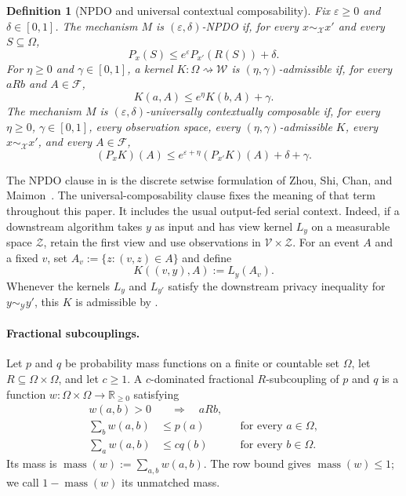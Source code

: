 \documentclass[11pt]{article}
\newtheorem{definition}[lemma]{Definition}
\begin{document}
\begin{definition}[NPDO and universal contextual composability]
\label{def:npdo-ucc}
Fix $\varepsilon\geq0$ and $\delta\in[0,1]$.
The mechanism $M$ is $(\varepsilon,\delta)$-NPDO if, for every
$x\sim_{\mathcal X}x'$ and every $S\subseteq\Omega$,
\begin{equation}
 P_x(S)\leq e^\varepsilon P_{x'}(R(S))+\delta.
 \label{eq:npdo}
\end{equation}
For $\eta\geq0$ and $\gamma\in[0,1]$, a kernel
$K:\Omega\rightsquigarrow\mathcal W$ is
$(\eta,\gamma)$-admissible if, for every $aRb$ and $A\in\mathcal F$,
\begin{equation}
 K(a,A)\leq e^\eta K(b,A)+\gamma.
 \label{eq:admissible}
\end{equation}
The mechanism $M$ is $(\varepsilon,\delta)$-universally contextually
composable if, for every $\eta\geq0$, $\gamma\in[0,1]$, every observation
space, every $(\eta,\gamma)$-admissible $K$, every
$x\sim_{\mathcal X}x'$, and every $A\in\mathcal F$,
\begin{equation}
 (P_xK)(A)
 \leq e^{\varepsilon+\eta}(P_{x'}K)(A)+\delta+\gamma.
 \label{eq:ucc}
\end{equation}
\end{definition}

The NPDO clause in  is the discrete setwise formulation of
Zhou, Shi, Chan, and Maimon~\cite{ZhouEtAl2023NPDO}.  The
universal-composability clause fixes the meaning of that term throughout this paper.
It includes the usual output-fed serial context.  Indeed, if a downstream
algorithm takes $y$ as input and has view kernel $L_y$ on a measurable space
$\mathcal Z$, retain the first view and use observations in
$\mathcal V\times\mathcal Z$.  For an event $A$ and a fixed $v$, set
$A_v:=\{z:(v,z)\in A\}$ and define
\[
 K((v,y),A):=L_y(A_v).
\]
Whenever the kernels $L_y$ and $L_{y'}$ satisfy the downstream privacy
inequality for $y\sim_{\mathcal Y}y'$, this $K$ is admissible by
.

\paragraph{Fractional subcouplings.}
Let $p$ and $q$ be probability mass functions on a finite or countable set
$\Omega$, let $R\subseteq\Omega\times\Omega$, and let $c\geq1$.  A
$c$-dominated fractional $R$-subcoupling of $p$ and $q$ is a function
$w:\Omega\times\Omega\to\mathbb R_{\geq0}$ satisfying
\begin{align}
 w(a,b)>0&\quad\Longrightarrow\quad aRb,
 \label{eq:w-support}\\
 \sum_b w(a,b)&\leq p(a) &&\text{for every }a\in\Omega,
 \label{eq:w-row}\\
 \sum_a w(a,b)&\leq c q(b) &&\text{for every }b\in\Omega.
 \label{eq:w-column}
\end{align}
Its mass is $\operatorname{mass}(w):=\sum_{a,b}w(a,b)$.  The row bound gives
$\operatorname{mass}(w)\leq1$; we call
$1-\operatorname{mass}(w)$ its unmatched mass.
\end{document}
